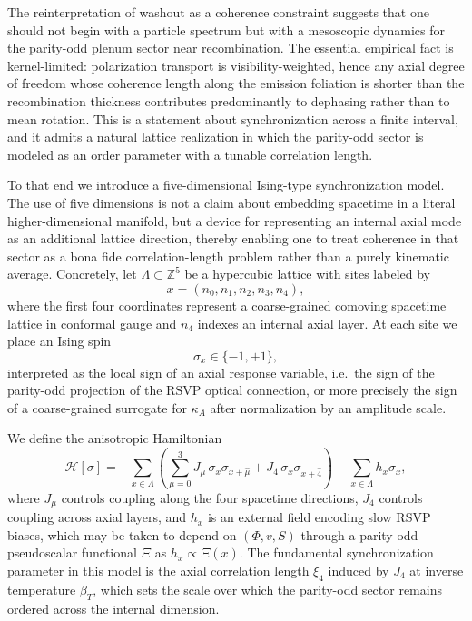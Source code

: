 \documentclass[12pt]{article}
\begin{document}
The reinterpretation of washout as a coherence constraint suggests that one should not begin with a particle spectrum but with a mesoscopic dynamics for the parity-odd plenum sector near recombination. The essential empirical fact is kernel-limited: polarization transport is visibility-weighted, hence any axial degree of freedom whose coherence length along the emission foliation is shorter than the recombination thickness contributes predominantly to dephasing rather than to mean rotation. This is a statement about synchronization across a finite interval, and it admits a natural lattice realization in which the parity-odd sector is modeled as an order parameter with a tunable correlation length.

To that end we introduce a five-dimensional Ising-type synchronization model. The use of five dimensions is not a claim about embedding spacetime in a literal higher-dimensional manifold, but a device for representing an internal axial mode as an additional lattice direction, thereby enabling one to treat coherence in that sector as a bona fide correlation-length problem rather than a purely kinematic average. Concretely, let $\Lambda \subset \mathbb{Z}^5$ be a hypercubic lattice with sites labeled by
\begin{equation}
x = (n_0,n_1,n_2,n_3,n_4),
\end{equation}
where the first four coordinates represent a coarse-grained comoving spacetime lattice in conformal gauge and $n_4$ indexes an internal axial layer. At each site we place an Ising spin
\begin{equation}
\sigma_x \in \{-1,+1\},
\end{equation}
interpreted as the local sign of an axial response variable, i.e.\ the sign of the parity-odd projection of the RSVP optical connection, or more precisely the sign of a coarse-grained surrogate for $\kappa_A$ after normalization by an amplitude scale.

We define the anisotropic Hamiltonian
\begin{equation}
\mathcal{H}[\sigma]
=
-\sum_{x\in\Lambda}
\left(
\sum_{\mu=0}^{3} J_\mu \, \sigma_x \sigma_{x+\hat\mu}
+
J_4 \, \sigma_x \sigma_{x+\hat 4}
\right)
-\sum_{x\in\Lambda} h_x \sigma_x,
\end{equation}
where $J_\mu$ controls coupling along the four spacetime directions, $J_4$ controls coupling across axial layers, and $h_x$ is an external field encoding slow RSVP biases, which may be taken to depend on $(\Phi,v,S)$ through a parity-odd pseudoscalar functional $\Xi$ as $h_x \propto \Xi(x)$. The fundamental synchronization parameter in this model is the axial correlation length $\xi_4$ induced by $J_4$ at inverse temperature $\beta_T$, which sets the scale over which the parity-odd sector remains ordered across the internal dimension.
\end{document}
